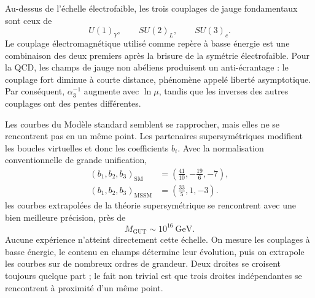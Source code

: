 Au-dessus de l’échelle électrofaible, les trois couplages de jauge fondamentaux sont ceux de
\begin{equation}
U(1)_Y,\qquad SU(2)_L,\qquad SU(3)_c.
\end{equation}
Le couplage électromagnétique utilisé comme repère à basse énergie est une combinaison des deux premiers après la brisure de la symétrie électrofaible. Pour la QCD, les champs de jauge non abéliens produisent un anti-écrantage : le couplage fort diminue à courte distance, phénomène appelé liberté asymptotique. Par conséquent, \(\alpha_3^{-1}\) augmente avec \(\ln\mu\), tandis que les inverses des autres couplages ont des pentes différentes.

Les courbes du Modèle standard semblent se rapprocher, mais elles ne se rencontrent pas en un même point. Les partenaires supersymétriques modifient les boucles virtuelles et donc les coefficients \(b_i\). Avec la normalisation conventionnelle de grande unification,
\begin{align}
(b_1,b_2,b_3)_{\mathrm{SM}}
&=\left(\frac{41}{10},-\frac{19}{6},-7\right),\\
(b_1,b_2,b_3)_{\mathrm{MSSM}}
&=\left(\frac{33}{5},1,-3\right).
\end{align}
les courbes extrapolées de la théorie supersymétrique se rencontrent avec une bien meilleure précision, près de
\begin{equation}
M_{\mathrm{GUT}}\sim 10^{16}\ \mathrm{GeV}.
\end{equation}
Aucune expérience n’atteint directement cette échelle. On mesure les couplages à basse énergie, le contenu en champs détermine leur évolution, puis on extrapole les courbes sur de nombreux ordres de grandeur. Deux droites se croisent toujours quelque part ; le fait non trivial est que trois droites indépendantes se rencontrent à proximité d’un même point.

\begin{classroomqa}
\end{classroomqa}

